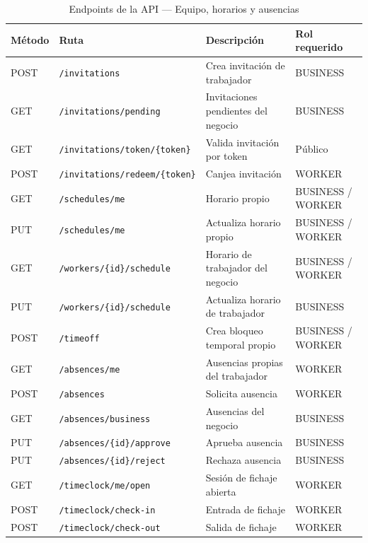 \documentclass[12pt,a4paper,twoside]{report}
\begin{document}
\begin{table}[htbp]
\centering
\scriptsize
\caption{Endpoints de la API — Equipo, horarios y ausencias}
\label{tab:endpoints-team}
\begin{tabularx}{\textwidth}{@{}L{0.10\textwidth}L{0.36\textwidth}Y L{0.18\textwidth}@{}}
\toprule
Método & Ruta & Descripción & Rol requerido \\
\midrule
POST & \texttt{/invitations} & Crea invitación de trabajador & BUSINESS \\
GET  & \texttt{/invitations/pending} & Invitaciones pendientes del negocio & BUSINESS \\
GET  & \texttt{/invitations/token/\{token\}} & Valida invitación por token & Público \\
POST & \texttt{/invitations/redeem/\{token\}} & Canjea invitación & WORKER \\
GET  & \texttt{/schedules/me} & Horario propio & BUSINESS / WORKER \\
PUT  & \texttt{/schedules/me} & Actualiza horario propio & BUSINESS / WORKER \\
GET  & \texttt{/workers/\{id\}/schedule} & Horario de trabajador del negocio & BUSINESS / WORKER \\
PUT  & \texttt{/workers/\{id\}/schedule} & Actualiza horario de trabajador & BUSINESS \\
POST & \texttt{/timeoff} & Crea bloqueo temporal propio & BUSINESS / WORKER \\
GET  & \texttt{/absences/me} & Ausencias propias del trabajador & WORKER \\
POST & \texttt{/absences} & Solicita ausencia & WORKER \\
GET  & \texttt{/absences/business} & Ausencias del negocio & BUSINESS \\
PUT  & \texttt{/absences/\{id\}/approve} & Aprueba ausencia & BUSINESS \\
PUT  & \texttt{/absences/\{id\}/reject} & Rechaza ausencia & BUSINESS \\
GET  & \texttt{/timeclock/me/open} & Sesión de fichaje abierta & WORKER \\
POST & \texttt{/timeclock/check-in} & Entrada de fichaje & WORKER \\
POST & \texttt{/timeclock/check-out} & Salida de fichaje & WORKER \\
\bottomrule
\end{tabularx}
\end{table}

\end{document}
